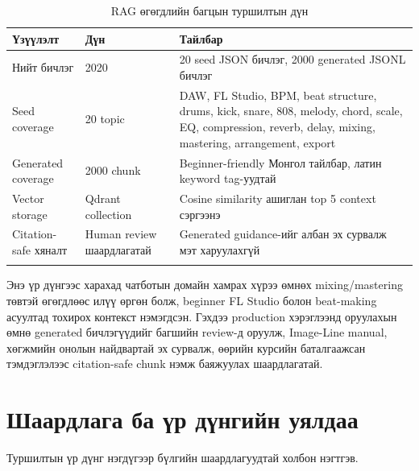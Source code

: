 \begin{longtable}{|p{}|p{}|p{}|}
  \hline
  \textbf{Үзүүлэлт} & \textbf{Дүн} & \textbf{Тайлбар} \\ \hline
  Нийт бичлэг & 2020 & 20 seed JSON бичлэг, 2000 generated JSONL бичлэг \\ \hline
  Seed coverage & 20 topic & DAW, FL Studio, BPM, beat structure, drums, kick, snare, 808, melody, chord, scale, EQ, compression, reverb, delay, mixing, mastering, arrangement, export \\ \hline
  Generated coverage & 2000 chunk & Beginner-friendly Монгол тайлбар, латин keyword tag-уудтай \\ \hline
  Vector storage & Qdrant collection & Cosine similarity ашиглан top 5 context сэргээнэ \\ \hline
  Citation-safe хяналт & Human review шаардлагатай & Generated guidance-ийг албан эх сурвалж мэт харуулахгүй \\ \hline
  \caption{RAG өгөгдлийн багцын туршилтын дүн}
  \label{tab:ch4-dataset-result}
\end{longtable}

Энэ үр дүнгээс харахад чатботын домайн хамрах хүрээ өмнөх mixing/mastering төвтэй өгөгдлөөс илүү өргөн болж, beginner FL Studio болон beat-making асуултад тохирох контекст нэмэгдсэн. Гэхдээ production хэрэглээнд оруулахын өмнө generated бичлэгүүдийг багшийн review-д оруулж, Image-Line manual, хөгжмийн онолын найдвартай эх сурвалж, өөрийн курсийн баталгаажсан тэмдэглэлээс citation-safe chunk нэмж баяжуулах шаардлагатай.

\section{Шаардлага ба үр дүнгийн уялдаа}
Туршилтын үр дүнг нэгдүгээр бүлгийн шаардлагуудтай холбон нэгтгэв.

